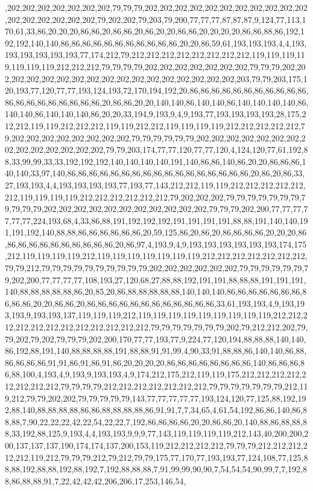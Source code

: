 ,202,202,202,202,202,202,202,79,79,79,202,202,202,202,202,202,202,202,202,202,202,202,202,202,202,202,202,79,202,202,79,203,79,200,77,77,77,87,87,87,9,124,77,113,170,61,33,86,20,20,20,86,86,20,86,86,20,86,20,20,86,86,20,20,20,20,86,86,88,86,192,192,192,140,140,86,86,86,86,86,86,86,86,86,86,86,20,20,86,59,61,193,193,193,4,4,193,193,193,193,193,193,77,174,212,79,212,212,212,212,212,212,212,212,119,119,119,119,119,119,119,212,212,212,79,79,79,79,202,202,202,202,202,202,202,79,79,79,202,202,202,202,202,202,202,202,202,202,202,202,202,202,202,202,202,203,79,79,203,175,120,193,77,120,77,77,193,124,193,72,170,194,192,20,86,86,86,86,86,86,86,86,86,86,86,86,86,86,86,86,86,86,86,86,20,86,86,20,20,140,140,86,140,140,86,140,140,140,140,86,140,140,86,140,140,140,86,20,20,33,194,9,193,9,4,9,193,77,193,193,193,193,28,175,212,212,119,119,212,212,212,119,119,212,212,119,119,119,119,212,212,212,212,212,79,202,202,202,202,202,202,202,202,79,79,79,79,79,79,202,202,202,202,202,202,202,202,202,202,202,202,202,202,79,79,203,174,77,77,120,77,77,120,4,124,120,77,61,192,88,33,99,99,33,33,192,192,192,140,140,140,140,191,140,86,86,140,86,20,20,86,86,86,140,140,33,97,140,86,86,86,86,86,86,86,86,86,86,86,86,86,86,86,86,86,20,86,20,86,33,27,193,193,4,4,193,193,193,193,77,193,77,143,212,212,119,119,212,212,212,212,212,212,119,119,119,119,212,212,212,212,212,212,79,202,202,202,79,79,79,79,79,79,79,79,79,79,79,202,202,202,202,202,202,202,202,202,202,202,79,79,79,202,200,77,77,77,77,77,77,224,193,68,4,33,86,88,191,192,192,192,191,191,191,191,88,88,191,140,140,191,191,192,140,88,88,86,86,86,86,86,86,20,59,125,86,20,86,20,86,86,86,86,20,20,20,86,86,86,86,86,86,86,86,86,86,86,20,86,97,4,193,9,4,9,193,193,193,193,193,193,174,175,212,119,119,119,119,212,119,119,119,119,119,119,119,212,212,212,212,212,212,212,79,79,212,79,79,79,79,79,79,79,79,79,79,202,202,202,202,202,202,79,79,79,79,79,79,79,202,200,77,77,77,77,108,193,27,120,68,27,88,88,192,191,191,88,88,88,191,191,191,140,88,88,88,88,88,86,20,85,20,86,88,88,88,88,88,140,140,140,86,86,86,86,86,86,86,86,86,86,20,20,86,86,20,86,86,86,86,86,86,86,86,86,86,86,86,33,61,193,193,4,9,193,193,193,9,193,193,137,119,119,119,212,119,119,119,119,119,119,119,119,119,212,212,212,212,212,212,212,212,212,212,212,212,79,79,79,79,79,79,79,202,79,212,212,202,79,79,202,79,202,79,79,79,202,200,170,77,77,193,77,9,224,77,120,194,88,88,88,140,140,86,192,88,191,140,88,88,88,88,191,88,88,91,91,99,4,90,33,91,88,88,86,140,140,86,88,86,86,86,86,91,91,86,91,86,91,86,20,20,20,20,86,86,86,86,86,86,86,86,140,86,86,86,86,88,100,4,193,4,9,193,9,193,193,4,9,174,212,175,212,119,119,175,212,212,212,212,212,212,212,212,79,79,79,79,212,212,212,212,212,212,212,79,79,79,79,79,79,79,212,119,212,79,79,202,202,79,79,79,79,79,143,77,77,77,77,77,193,124,120,77,125,88,192,192,88,140,88,88,88,88,86,86,88,88,88,88,86,91,91,7,7,34,65,4,61,54,192,86,86,140,86,88,88,7,90,22,22,22,42,22,54,22,22,7,192,86,86,86,86,20,20,86,86,20,140,88,86,88,88,88,33,192,88,125,9,193,4,4,193,193,9,9,9,77,143,119,119,119,119,212,143,40,200,200,200,137,137,137,190,174,174,137,200,153,119,212,212,212,212,79,79,79,212,212,212,212,212,119,212,79,79,79,212,79,212,79,79,175,77,170,77,193,193,77,124,108,77,125,88,88,192,88,88,192,88,192,7,192,88,88,88,7,91,99,99,90,90,7,54,54,54,90,99,7,7,192,88,86,88,88,91,7,22,42,42,42,206,206,17,253,146,54,